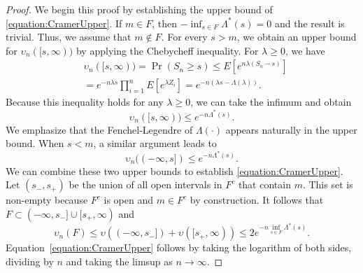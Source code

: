 \begin{proof}
We begin this proof by establishing the upper bound of \eqref{equation:CramerUpper}.
If $m \in F$, then $- \inf_{s \in F} \Lambda^*(s) = 0$ and the result is trivial.
Thus, we assume that $m \notin F$.
For every $s > m$, we obtain an upper bound for $\upsilon_n ([s, \infty))$ by applying the Chebycheff inequality.
For $\lambda \geq 0$, we have
\begin{equation*}
\begin{split}
&\upsilon_n ([s, \infty))
= \Pr ( S_n \geq s )
\leq E \left[ e^{n \lambda (S_n - s)} \right] \\
&= e^{-n \lambda s} \prod_{i=1}^n E \left[ e^{\lambda Z_i} \right]
= e^{-n(\lambda s - \Lambda(\lambda))} .
\end{split}
\end{equation*}
Because this inequality holds for any $\lambda \geq 0$, we can take the infimum and obtain
\begin{equation*}
\upsilon_n ([s, \infty)) \leq e^{-n \Lambda^*(s)} .
\end{equation*}
We emphasize that the Fenchel-Legendre of $\Lambda (\cdot)$ appears naturally in the upper bound.
When $s < m$, a similar argument leads to
\begin{equation*}
\upsilon_n ((-\infty,s]) \leq e^{-n \Lambda^*(s)} .
\end{equation*}
We can combine these two upper bounds to establish \eqref{equation:CramerUpper}.
Let $(s_{-}, s_{+})$ be the union of all open intervals in $F^c$ that contain $m$.
This set is non-empty because $F^c$ is open and $m \in F^c$ by construction.
It follows that $F \subset (-\infty, s_{-}] \cup [s_{+}, \infty)$ and
\begin{equation*}
\upsilon_n(F) \leq \upsilon ((-\infty, s_{-}])
+ \upsilon ([s_{+}, \infty))
\leq 2 e^{- n \inf_{s \in F} \Lambda^* (s)} .
\end{equation*}
Equation~\eqref{equation:CramerUpper} follows by taking the logarithm of both sides, dividing by $n$ and taking the limsup as $n \rightarrow \infty$.


\end{proof}

